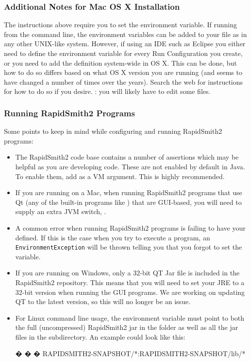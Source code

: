 \subsubsection{Additional Notes for Mac OS X Installation}

The instructions above require you to set the 
environment variable.  If running from the command line, the environment
variables can be added to your  file as in any other
UNIX-like system.  However, if using an IDE such as Eclipse you either need to
define the environment variable for every Run Configuration you create, or you
need to add the  definition system-wide in OS X. This can
be done, but how to do so differs based on what OS X version you are running
(and seems to have changed a number of times over the years). Search the web for
instructions for how to do so if you desire. : you will likely have
to edit some  files.

\subsubsection{Running RapidSmith2 Programs}
Some points to keep in mind while configuring and running RapidSmith2 programs:
\begin{itemize}
  \item The RapidSmith2 code base contains a number of assertions which may be helpful  
  as you are developing code.  These are not enabled by default in Java.  To
  enable them, add  as a VM argument.  This is highly recommended.
  \item If you are running on a Mac, when running RapidSmith2 programs that use Qt  (any
  of the built-in programs like ) that are GUI-based, you
  will need to supply an extra JVM switch, .
  \item A common error when running RapidSmith2 programs is failing to have your
   defined.  If this is the case when you try to execute a
  program, an \texttt{EnvironmentException} will be thrown telling you that you
  forgot to set the variable.
  \item If you are running on Windows, only a 32-bit QT Jar file is included in
  the RapidSmith2 repository. This means that you will need to set your JRE to a 32-bit
  version when running the GUI programs. We are working on updating QT to the
  latest version, so this will no longer be an issue.
  \item For Linux command line usage, the  environment variable
  must point to both the full (uncompressed) RapidSmith2 jar in the 
  folder as well as all the jar files in the  subdirectory. An example
   could look like this:
  \vspace{-0.15in}  \begin{code}
  �  �  � RAPIDSMITH2-SNAPSHOT/*:RAPIDSMITH2-SNAPSHOT/lib/*
  \end{code}
\end{itemize}

